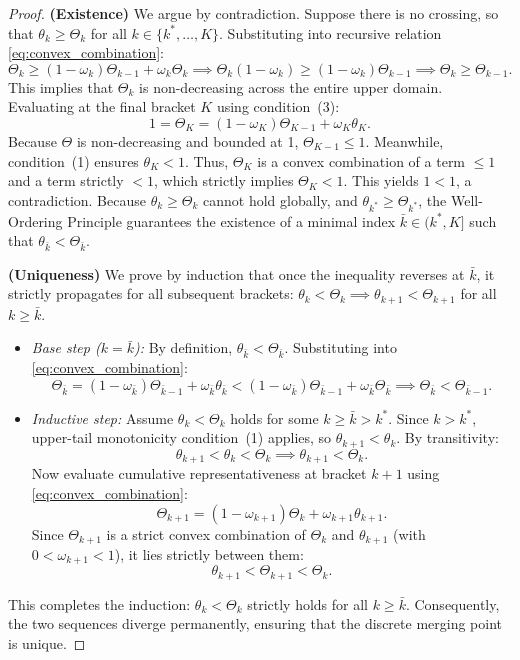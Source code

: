 \begin{proof}
\textbf{(Existence)} We argue by contradiction. Suppose there is no crossing, so that $\theta_k \ge \Theta_k$ for all $k \in \{k^*, \dots, K\}$. Substituting into recursive relation \eqref{eq:convex_combination}:
\[
    \Theta_k \ge (1 - \omega_k)\Theta_{k-1} + \omega_k \Theta_k \implies \Theta_k(1 - \omega_k) \ge (1 - \omega_k)\Theta_{k-1} \implies \Theta_k \ge \Theta_{k-1}.
\]
This implies that $\Theta_k$ is non-decreasing across the entire upper domain. Evaluating at the final bracket $K$ using condition~(3):
\[
    1 = \Theta_K = (1 - \omega_K)\Theta_{K-1} + \omega_K \theta_K.
\]
Because $\Theta$ is non-decreasing and bounded at 1, $\Theta_{K-1} \le 1$. Meanwhile, condition~(1) ensures $\theta_K < 1$. Thus, $\Theta_K$ is a convex combination of a term $\le 1$ and a term strictly $< 1$, which strictly implies $\Theta_K < 1$. This yields $1 < 1$, a contradiction.
Because $\theta_k \ge \Theta_k$ cannot hold globally, and $\theta_{k^*} \ge \Theta_{k^*}$, the Well-Ordering Principle guarantees the existence of a minimal index $\bar{k} \in (k^*, K]$ such that $\theta_{\bar{k}} < \Theta_{\bar{k}}$.

\textbf{(Uniqueness)} We prove by induction that once the inequality reverses at $\bar{k}$, it strictly propagates for all subsequent brackets: $\theta_k < \Theta_k \implies \theta_{k+1} < \Theta_{k+1}$ for all $k \ge \bar{k}$.
\begin{itemize}
    \item \textit{Base step ($k = \bar{k}$):} By definition, $\theta_{\bar{k}} < \Theta_{\bar{k}}$. Substituting into \eqref{eq:convex_combination}:
    \[
        \Theta_{\bar{k}} = (1 - \omega_{\bar{k}})\Theta_{\bar{k}-1} + \omega_{\bar{k}}\theta_{\bar{k}} < (1 - \omega_{\bar{k}})\Theta_{\bar{k}-1} + \omega_{\bar{k}}\Theta_{\bar{k}} \implies \Theta_{\bar{k}} < \Theta_{\bar{k}-1}.
    \]
    \item \textit{Inductive step:} Assume $\theta_k < \Theta_k$ holds for some $k \ge \bar{k} > k^*$. Since $k > k^*$, upper-tail monotonicity condition~(1) applies, so $\theta_{k+1} < \theta_k$.
    By transitivity:
    \[
        \theta_{k+1} < \theta_k < \Theta_k \implies \theta_{k+1} < \Theta_k.
    \]
    Now evaluate cumulative representativeness at bracket $k+1$ using \eqref{eq:convex_combination}:
    \[
        \Theta_{k+1} = (1 - \omega_{k+1})\Theta_k + \omega_{k+1}\theta_{k+1}.
    \]
    Since $\Theta_{k+1}$ is a strict convex combination of $\Theta_k$ and $\theta_{k+1}$ (with $0 < \omega_{k+1} < 1$), it lies strictly between them:
    \[
        \theta_{k+1} < \Theta_{k+1} < \Theta_k.
    \]
\end{itemize}
This completes the induction: $\theta_k < \Theta_k$ strictly holds for all $k \ge \bar{k}$. Consequently, the two sequences diverge permanently, ensuring that the discrete merging point is unique.
\end{proof}
